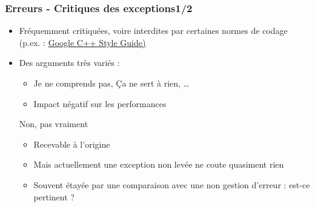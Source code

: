 \documentclass[C++.tex]{subfiles}
\begin{document}
\begin{frame}
	\frametitle{Erreurs - Critiques des exceptions\titlehfill{}1/2}
	\begin{itemize}
		\item Fréquemment critiquées, voire interdites par certaines normes de codage (p.ex. : \href{https://google.github.io/styleguide/cppguide.html}{Google C++ Style Guide)}
		\item Des arguments très variés :
		\begin{itemize}
			\item \og Je ne comprends pas\fg{}, \og Ça ne sert à rien\fg{}, \ldots
			\item Impact négatif sur les performances
		\end{itemize}

		\pause

		\begin{block}{Non, pas vraiment}
			\begin{itemize}
				\item Recevable à l'origine
				\item Mais actuellement une exception non levée ne coute quasiment rien
				\item Souvent étayée par une comparaison avec une non gestion d'erreur : est-ce pertinent ? 
			\end{itemize}
		\end{block}
	\end{itemize}
\end{frame}
\end{document}
